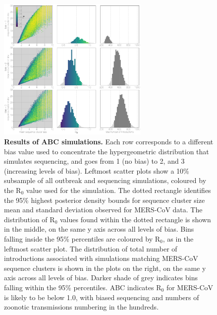 \documentclass[11pt,oneside,letterpaper]{article}
\begin{document}
\begin{figure}[h]
\centering
	\includegraphics[width=0.65\textwidth]{figures/mers_epi.png}
	\caption{\textbf{Results of ABC simulations.}
Each row corresponds to a different bias value used to concentrate the hypergeometric distribution that simulates sequencing, and goes from 1 (no bias) to 2, and 3 (increasing levels of bias).
Leftmost scatter plots show a 10\% subsample of all outbreak and sequencing simulations, coloured by the R$_{0}$ value used for the simulation.
The dotted rectangle identifies the 95\% highest posterior density bounds for sequence cluster size mean and standard deviation observed for MERS-CoV data.
The distribution of R$_{0}$ values found within the dotted rectangle is shown in the middle, on the same y axis across all levels of bias.
Bins falling inside the 95\% percentiles are coloured by R$_{0}$, as in the leftmost scatter plot.
The distribution of total number of introductions associated with simulations matching MERS-CoV sequence clusters is shown in the plots on the right, on the same y axis across all levels of bias.
Darker shade of grey indicates bins falling within the 95\% percentiles.
ABC indicates R$_{0}$ for MERS-CoV is likely to be below 1.0, with biased sequencing and numbers of zoonotic transmissions numbering in the hundreds.
	}
	\label{ABC}
\end{figure}


%
\end{document}
